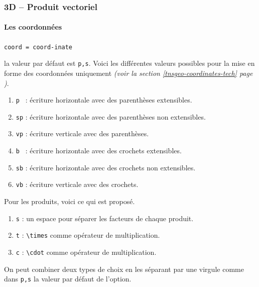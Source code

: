 \documentclass[12pt,a4paper]{book}
\newcommand\env[1]{\texttt{#1}}
\newcommand\macro[1]{\env{\textbackslash{}#1}}
\theoremstyle{definition}
\newcommand\mwhyprefix[2]{%
	\texttt{#1 = #1-#2}%
}
\newcommand\prefix[1]{%
	\texttt{#1}%
}
\begin{document}
{{\subsubsection{3D -- Produit vectoriel}

\paragraph{Les coordonnées}



  \hfill \mwhyprefix{coord}{inate}

\IDoption{} la valeur par défaut est \verb+p,s+. 
            Voici les différentes valeurs possibles pour la mise en forme des coordonnées uniquement \emph{(voir la section \ref{tnsgeo-coordinates-tech} page \pageref{tnsgeo-coordinates-tech})}.
\begin{enumerate}
	\item \verb+p + : écriture horizontale avec des parenthèses extensibles.

	\item \verb+sp+ : écriture horizontale avec des parenthèses non extensibles.

	\item \verb+vp+ : écriture verticale avec des parenthèses.

	\medskip
	
	\item \verb+b + : écriture horizontale avec des crochets extensibles.

	\item \verb+sb+ : écriture horizontale avec des crochets non extensibles.

	\item \verb+vb+ : écriture verticale avec des crochets.
\end{enumerate}

            Pour les produits, voici ce qui est proposé.
\begin{enumerate}
	\item \prefix{s} : un espace pour séparer les facteurs de chaque produit.

	\item \prefix{t} : \macro{times} comme opérateur de multiplication.

	\item \prefix{c} : \macro{cdot} comme opérateur de multiplication.
\end{enumerate}

            On peut combiner deux types de choix en les séparant par une virgule comme dans \verb+p,s+ la valeur par défaut de l'option.


}}
\end{document}
